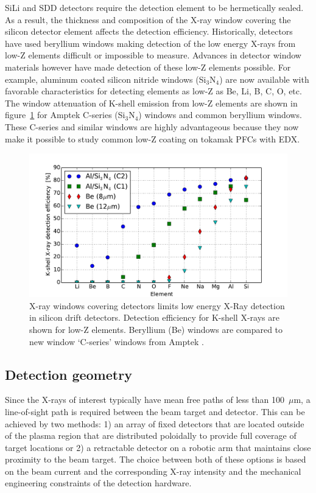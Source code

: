 \documentclass[12pt,letterpaper,final]{article}
\begin{document}
SiLi and SDD detectors require the detection element to be hermetically sealed. As a result, the thickness and composition of the X-ray window covering the silicon detector element affects the detection efficiency. Historically, detectors have used beryllium windows making detection of the low energy X-rays from low-Z elements difficult or impossible to measure. Advances in detector window materials however have made detection of these low-Z elements possible.  For example, aluminum coated silicon nitride windows (Si$_3$N$_4$) are now available with favorable characteristics for detecting elements as low-Z as Be, Li, B, C, O, etc.  The window attenuation of K-shell emission from low-Z elements are shown in figure~\ref{fig:DetectorEff} for Amptek C-series (Si$_3$N$_4$) windows and common beryllium windows. These C-series and similar windows are highly advantageous because they now make it possible to study common low-Z coating on tokamak PFCs with EDX.

\begin{figure}[!h]
 \centering
  \includegraphics[width=\columnwidth]{figures/KShellDetectorEfficiency.pdf}
 \caption{X-ray windows covering detectors limits low energy X-Ray detection in silicon drift detectors. Detection efficiency for K-shell X-rays are shown for low-Z elements. Beryllium (Be) windows are compared to new window `C-series' windows from Amptek \cite{Amptek}. }
 \label{fig:DetectorEff}
\end{figure}


\subsection{Detection geometry}
\label{sec:DetectionGeometry}

Since the X-rays of interest typically have mean free paths of less than 100~$\mu$m, a line-of-sight path is required between the beam target and detector. This can be achieved by two methods: 1) an array of fixed detectors that are located outside of the plasma region that are distributed poloidally to provide full coverage of target locations or 2) a retractable detector on a robotic arm that maintains close proximity to the beam target. The choice between both of these options is based on the beam current and the corresponding X-ray intensity and the mechanical engineering constraints of the detection hardware. 
\end{document}
